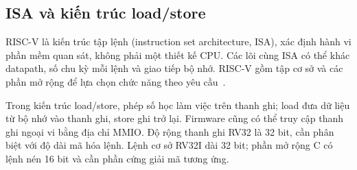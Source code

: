 \subsection{ISA và kiến trúc load/store}
RISC-V là kiến trúc tập lệnh (instruction set architecture, ISA), xác định hành vi phần mềm quan sát, không phải một thiết kế CPU. Các lõi cùng ISA có thể khác datapath, số chu kỳ mỗi lệnh và giao tiếp bộ nhớ. RISC-V gồm tập cơ sở và các phần mở rộng để lựa chọn chức năng theo yêu cầu~\cite{waterman2014risc}.

Trong kiến trúc load/store, phép số học làm việc trên thanh ghi; load đưa dữ liệu từ bộ nhớ vào thanh ghi, store ghi trở lại. Firmware cũng có thể truy cập thanh ghi ngoại vi bằng địa chỉ MMIO. Độ rộng thanh ghi RV32 là 32 bit, cần phân biệt với độ dài mã hóa lệnh. Lệnh cơ sở RV32I dài 32 bit; phần mở rộng C có lệnh nén 16 bit và cần phần cứng giải mã tương ứng.
